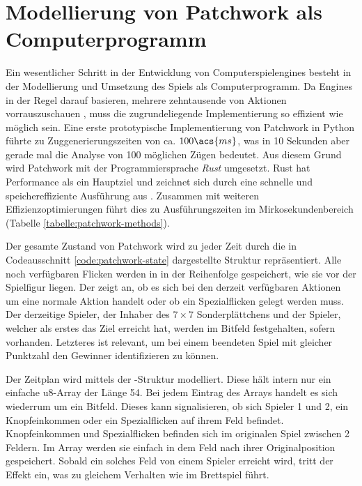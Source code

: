 \chapter[Modellierung als Computerprogramm]{Modellierung von Patchwork als Computerprogramm}
\label{chapter:modellierung-von-patchwork-als-computerprogramm}

Ein wesentlicher Schritt in der Entwicklung von Computerspielengines besteht in der Modellierung und Umsetzung des Spiels als Computerprogramm. Da Engines in der Regel darauf basieren, mehrere zehntausende von Aktionen vorrauszuschauen \cite{2018.AlphaZero}, muss die zugrundeliegende Implementierung so effizient wie möglich sein. Eine erste prototypische Implementierung von Patchwork in Python führte zu Zuggenerierungszeiten von ca. $100\acs{ms}$, was in 10 Sekunden aber gerade mal die Analyse von 100 möglichen Zügen bedeutet. Aus diesem Grund wird Patchwork mit der Programmiersprache \emph{Rust} \cite{2014.Rust} umgesetzt. Rust hat Performance als ein Hauptziel und zeichnet sich durch eine schnelle und speichereffiziente Ausführung aus \cite{2024.Rust}. Zusammen mit weiteren Effizienzoptimierungen führt dies zu Ausführungszeiten im Mirkosekundenbereich (Tabelle \ref{tabelle:patchwork-methods}).



Der gesamte Zustand von Patchwork wird zu jeder Zeit durch die in Codeausschnitt \ref{code:patchwork-state} dargestellte Struktur  repräsentiert. Alle noch verfügbaren Flicken werden in  in der Reihenfolge gespeichert, wie sie vor der Spielfigur liegen. Der  zeigt an, ob es sich bei den derzeit verfügbaren Aktionen um eine normale Aktion handelt oder ob ein Spezialflicken gelegt werden muss. Der derzeitige Spieler, der Inhaber des $7\times 7$ Sonderplättchens und der Spieler, welcher als erstes das Ziel erreicht hat, werden im Bitfeld  festgehalten, sofern vorhanden. Letzteres ist relevant, um bei einem beendeten Spiel mit gleicher Punktzahl den Gewinner identifizieren zu können.

Der Zeitplan wird mittels der -Struktur modelliert. Diese hält intern nur ein einfache \ac{u8}-Array der Länge 54. Bei jedem Eintrag des Arrays handelt es sich wiederrum um ein Bitfeld. Dieses kann signalisieren, ob sich Spieler 1 und 2, ein Knopfeinkommen oder ein Spezialflicken auf ihrem Feld befindet. Knopfeinkommen und Spezialflicken befinden sich im originalen Spiel zwischen 2 Feldern. Im Array werden sie einfach in dem Feld nach ihrer Originalposition gespeichert. Sobald ein solches Feld von einem Spieler erreicht wird, tritt der Effekt ein, was zu gleichem Verhalten wie im Brettspiel führt.

